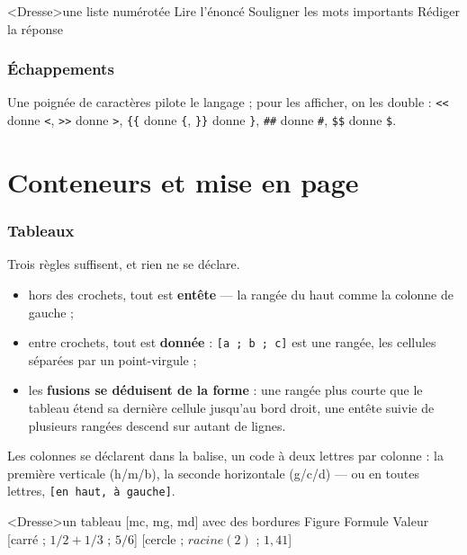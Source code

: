 \documentclass[11pt,a4paper]{article}
\newcommand{\bal}[1]{\texttt{#1}}
\begin{document}
\begin{code}
<Dresse>une liste numérotée{
    Lire l'énoncé
    Souligner les mots importants
    Rédiger la réponse
}
\end{code}

\section{Échappements}

Une poignée de caractères pilote le langage ; pour les afficher, on
les double : \bal{<{}<} donne \texttt{<}, \bal{>{}>} donne \texttt{>},
\bal{\{\{} donne \texttt{\{}, \bal{\}\}} donne \texttt{\}}, \bal{\#\#}
donne \texttt{\#}, \bal{\$\$} donne \texttt{\$}.

\part{Conteneurs et mise en page}

\section{Tableaux}

Trois règles suffisent, et rien ne se déclare.

\begin{itemize}[nosep]
\item hors des crochets, tout est \textbf{entête} --- la rangée du haut
comme la colonne de gauche ;
\item entre crochets, tout est \textbf{donnée} : \bal{[a ; b ; c]} est une
rangée, les cellules séparées par un point-virgule ;
\item les \textbf{fusions se déduisent de la forme} : une rangée plus
courte que le tableau étend sa dernière cellule jusqu'au bord droit, une
entête suivie de plusieurs rangées descend sur autant de lignes.
\end{itemize}

Les colonnes se déclarent dans la balise, un code à deux lettres par
colonne : la première verticale (h/m/b), la seconde horizontale (g/c/d)
--- ou en toutes lettres, \bal{[en haut, à gauche]}.

\begin{code}
<Dresse>un tableau [mc, mg, md] avec des bordures{
    Figure    Formule       Valeur
    [carré ; $1/2 + 1/3$ ; $5/6$]
    [cercle ; $racine(2)$ ; $1,41$]
}
\end{code}
\end{document}
